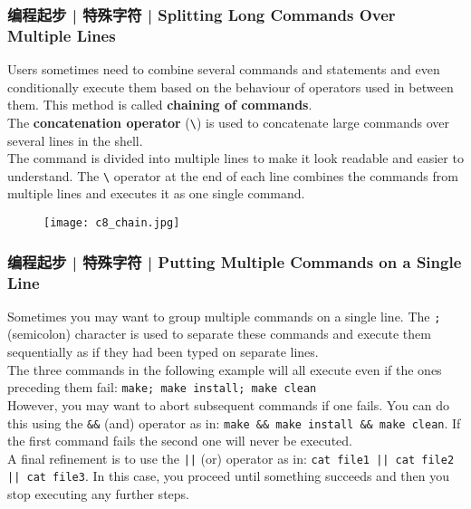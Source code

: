 \begin{frame}[fragile]
  \frametitle{编程起步 | 特殊字符 | Splitting Long Commands Over Multiple Lines}
  Users sometimes need to combine several commands and statements and even conditionally execute them based on the behaviour of operators used in between them. This method is called \textbf{chaining of commands}.\\
  \vspace{0.2cm}
  The \textbf{concatenation operator} (\verb|\|) is used to concatenate large commands over several lines in the shell.\\
  \vspace{0.2cm}
  The command is divided into multiple lines to make it look readable and easier to understand. The \verb|\| operator at the end of each line combines the commands from multiple lines and executes it as one single command.
  \begin{figure}
    \centering
    \texttt{[image: c8\_chain.jpg]}
  \end{figure}
\end{frame}

\begin{frame}[fragile]
  \frametitle{编程起步 | 特殊字符 | Putting Multiple Commands on a Single Line}
  Sometimes you may want to group multiple commands on a single line. The \verb|;| (semicolon) character is used to separate these commands and execute them sequentially as if they had been typed on separate lines.\\
  \vspace{0.2cm}
  The three commands in the following example will all execute even if the ones preceding them fail: \verb|make; make install; make clean|\\
  \vspace{0.2cm}
  However, you may want to abort subsequent commands if one fails. You can do this using the \verb|&&| (and) operator as in: \verb|make && make install && make clean|. If the first command fails the second one will never be executed.\\
  \vspace{0.2cm}
  A final refinement is to use the \verb=||= (or) operator as in: \verb=cat file1 || cat file2 || cat file3=. In this case, you proceed until something succeeds and then you stop executing any further steps.
\end{frame}

